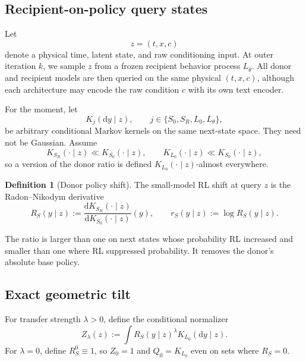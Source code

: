 \documentclass[11pt,a4paper]{article}
\newcommand{\dd}{\mathrm{d}}
\newcommand{\Sbase}{S_0}
\newcommand{\Srl}{S_R}
\newcommand{\Lbase}{L_0}
\newcommand{\Lactor}{L_\theta}
\newcommand{\Lbeh}{L_{\bar\theta}}
\theoremstyle{plain}
\theoremstyle{definition}
\newtheorem{definition}[theorem]{Definition}
\begin{document}
\subsection{Recipient-on-policy query states}

Let
\begin{equation}
z=(t,x,c)
\label{eq:query-state}
\end{equation}
denote a physical time, latent state, and raw conditioning input.  At outer iteration $k$, we
sample $z$ from a frozen recipient behavior process $\Lbeh$.  All donor and recipient models are
then queried on the same physical $(t,x,c)$, although each architecture may encode the raw
condition $c$ with its own text encoder.

For the moment, let
\begin{equation}
K_j(\dd y\mid z),
\qquad
j\in\{\Sbase,\Srl,\Lbase,\Lactor\},
\label{eq:general-kernels}
\end{equation}
be arbitrary conditional Markov kernels on the same next-state space.  They need not be Gaussian.
Assume
\begin{equation}
K_{\Srl}(\cdot\mid z)\ll K_{\Sbase}(\cdot\mid z),
\qquad
K_{\Lbase}(\cdot\mid z)\ll K_{\Sbase}(\cdot\mid z),
\label{eq:absolute-continuity}
\end{equation}
so a version of the donor ratio is defined
$K_{\Lbase}(\cdot\mid z)$-almost everywhere.

\begin{definition}[Donor policy shift]
\label{def:donor-ratio}
The small-model RL shift at query $z$ is the Radon--Nikodym derivative
\begin{equation}
R_S(y\mid z)
:=
\frac{
  \dd K_{\Srl}(\cdot\mid z)
}{
  \dd K_{\Sbase}(\cdot\mid z)
}(y),
\qquad
r_S(y\mid z):=\log R_S(y\mid z).
\label{eq:donor-ratio}
\end{equation}
\end{definition}

The ratio is larger than one on next states whose probability RL increased and smaller than one
where RL suppressed probability.  It removes the donor's absolute base policy.

\subsection{Exact geometric tilt}

For transfer strength $\lambda>0$, define the conditional normalizer
\begin{equation}
Z_\lambda(z)
:=
\int
R_S(y\mid z)^\lambda
K_{\Lbase}(\dd y\mid z).
\label{eq:kernel-normalizer}
\end{equation}
For $\lambda=0$, define $R_S^0\equiv1$, so
$Z_0=1$ and $Q_0=K_{\Lbase}$ even on sets where $R_S=0$.
\end{document}
